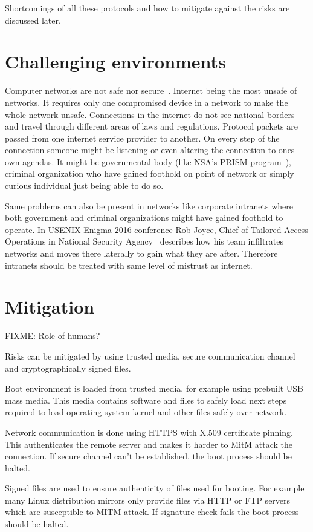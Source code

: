 Shortcomings of all these protocols and how to mitigate against the
risks are discussed later.

\section{Challenging environments}

Computer networks are not safe nor secure~\cite{beyondcorp}. Internet
being the most unsafe of networks. It requires only one compromised
device in a network to make the whole network unsafe. Connections in
the internet do not see national borders and travel through different
areas of laws and regulations. Protocol packets are passed from one
internet service provider to another. On every step of the connection
someone might be listening or even altering the connection to ones own
agendas. It might be governmental body (like NSA's PRISM
program~\cite{nsa-prism}), criminal organization who have gained
foothold on point of network or simply curious individual just being
able to do so.

Same problems can also be present in networks like corporate intranets
where both government and criminal organizations might have gained
foothold to operate. In USENIX Enigma 2016 conference Rob Joyce, Chief
of Tailored Access Operations in National Security
Agency~\cite{nsa-tao} describes how his team infiltrates networks and
moves there laterally to gain what they are after. Therefore intranets
should be treated with same level of mistrust as internet.


\section{Mitigation}

FIXME: Role of humans?

Risks can be mitigated by using trusted media, secure communication
channel and cryptographically signed files.

Boot environment is loaded from trusted media, for example using
prebuilt USB mass media. This media contains software and files to
safely load next steps required to load operating system kernel and
other files safely over network.

Network communication is done using HTTPS with X.509 certificate
pinning. This authenticates the remote server and makes it harder to
MitM attack the connection. If secure channel can't be established,
the boot process should be halted.

Signed files are used to ensure authenticity of files used for
booting. For example many Linux distribution mirrors only provide
files via HTTP or FTP servers which are susceptible to MITM attack. If
signature check fails the boot process should be halted.
